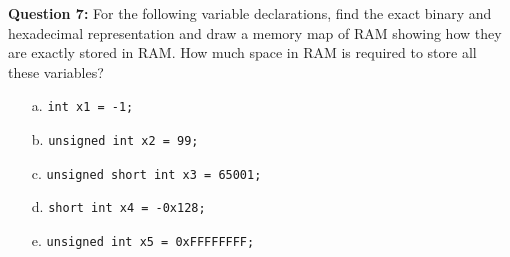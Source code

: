 \documentclass[12pt,a4paper]{article}
\begin{document}
\noindent\textbf{Question 7:} For the following variable declarations, find the exact binary and hexadecimal representation and draw a memory map of RAM showing how they are exactly stored in RAM. How much space in RAM is required to store all these variables?
\begin{enumerate}
\item[a.] \verb|int x1 = -1;|
\item[b.] \verb|unsigned int x2 = 99;|
\item[c.] \verb|unsigned short int x3 = 65001;|
\item[d.] \verb|short int x4 = -0x128;|
\item[e.] \verb|unsigned int x5 = 0xFFFFFFFF;|
\end{enumerate}
\end{document}
